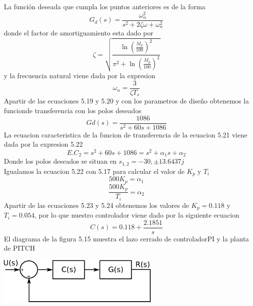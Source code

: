 La función deseada que cumpla los puntos anteriores es de la forma 
\begin{equation}
	G_d(s) = \frac{\omega_n^2}{s^2 + 2\zeta\omega + \omega_n^2}
\end{equation}
donde el factor de amortiguamiento esta dado por
\begin{equation}
	\zeta = \sqrt{\frac{\ln\left(\frac{M_p}{100}\right)^2}{\pi^2 + \ln\left(\frac{M_p}{100}\right)^2}}
\end{equation}
y la frecuencia natural viene dada por la expresion
\begin{equation}
	\omega_n = \frac{3}{\zeta T_s}
\end{equation}
Apartir de las ecuaciones 5.19 y 5.20 y con los parametros de diseño obtenemos la funcionde transferencia con los polos deseados 
\begin{equation}
	Gd(s) = \frac{1086}{s^2 + 60s + 1086}
\end{equation}
La ecuacion caracteristica de la funcion de transferencia de la ecuacion 5.21 viene dada por la 
expresion 5.22
\begin{equation}
	E.C_2 = s^2 + 60s + 1086 = s^2 + \alpha_1s + \alpha_2
\end{equation}
Donde los polos deseados se situan en $s_{1,2} = -30, \pm 13.6437j$ \\
Igualamos la ecuacion 5.22 con 5.17 para calcular el valor de $K_p$ y $T_i$
\begin{equation}
	500K_p = \alpha_1
\end{equation}
\begin{equation}
	\frac{500K_p}{T_i} = \alpha_2
\end{equation}
Apartir de las ecuaciones 5.23 y 5.24 obtenemos los valores de $K_p = 0.118$ y $T_i = 0.054$, por lo que nuestro controlador viene dado por la siguiente 
ecuacion
\begin{equation}
	C(s) = 0.118 + \frac{2.1851}{s}
\end{equation}
El diagrama de la figura 5.15 muestra el lazo cerrado de controladorPI y la planta de PITCH
\begin{center}
	\includegraphics[width=0.6\textwidth]{Contenido/Cuerpo/Capitulo5/Fig37.eps}
	\label{Fig4}
\end{center}
